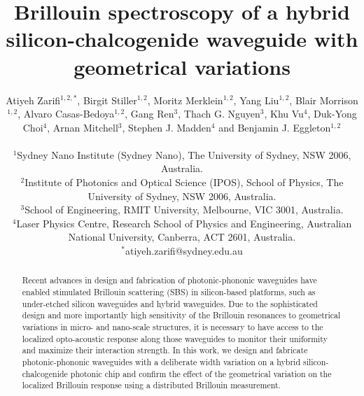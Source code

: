 \documentclass[superscriptaddress, nofootinbib, twocolumn, amsmath,amssymb, aps, pra, notitlepage, longbibliography]{revtex4-1}
\begin{document}
\title{Brillouin spectroscopy of a hybrid silicon-chalcogenide waveguide with geometrical variations}

\author{Atiyeh Zarifi$^{1,2,\ast}$, Birgit Stiller$^{1,2}$, Moritz Merklein$^{1,2}$, Yang Liu$^{1,2}$, Blair Morrison$^{1,2}$, Alvaro Casas-Bedoya$^{1,2}$, Gang Ren$^{3}$, Thach G. Nguyen$^{3}$, Khu Vu$^{4}$, Duk-Yong Choi$^{4}$, Arnan Mitchell$^{3}$, Stephen J. Madden$^{4}$ and Benjamin J. Eggleton$^{1,2}$\\
\small{ \textcolor{white}{blanc\\}
$^{1}$Sydney Nano Institute (Sydney Nano), The University of Sydney, NSW 2006, Australia.\\
$^{2}$Institute of Photonics and Optical Science (IPOS), School of Physics, The University of Sydney, NSW 2006, Australia.\\
$^{3}$School of Engineering, RMIT University, Melbourne, VIC 3001, Australia.\\
$^{4}$Laser Physics Centre, Research School of Physics and Engineering, Australian National University, Canberra, ACT 2601, Australia.\\
$^{\ast}$atiyeh.zarifi@sydney.edu.au}}



\begin{abstract}
Recent advances in design and fabrication of photonic-phononic waveguides have enabled stimulated Brillouin scattering (SBS) in silicon-based platforms, such as under-etched silicon waveguides and hybrid waveguides.
Due to the sophisticated design and more importantly high sensitivity of the Brillouin resonances to geometrical variations in micro- and nano-scale structures, it is necessary to have access to the localized opto-acoustic response along those waveguides to monitor their uniformity and maximize their interaction strength. 
In this work, we design and fabricate photonic-phononic waveguides with a deliberate width variation on a hybrid silicon-chalcogenide photonic chip and confirm the effect of the geometrical variation on the localized Brillouin response using a distributed Brillouin measurement.


\end{abstract}

\maketitle

\end{document}
